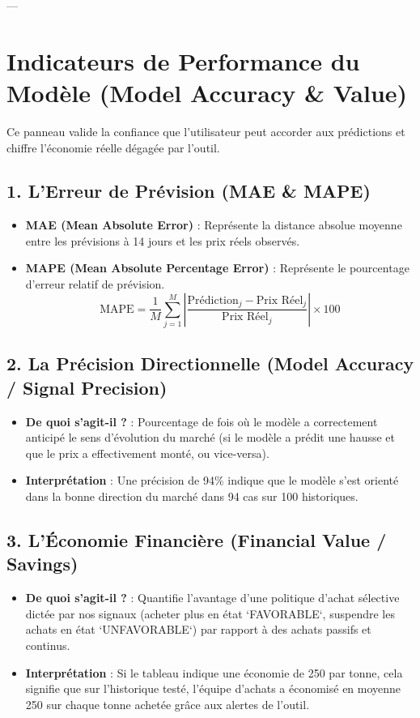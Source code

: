 \documentclass[12pt,a4paper]{article}
\begin{document}
---

\section{Indicateurs de Performance du Modèle (Model Accuracy \& Value)}
Ce panneau valide la confiance que l'utilisateur peut accorder aux prédictions et chiffre l'économie réelle dégagée par l'outil.

\subsection{1. L'Erreur de Prévision (MAE \& MAPE)}
\begin{itemize}
    \item \textbf{MAE (Mean Absolute Error)} : Représente la distance absolue moyenne entre les prévisions à 14 jours et les prix réels observés.
    \item \textbf{MAPE (Mean Absolute Percentage Error)} : Représente le pourcentage d'erreur relatif de prévision.
    \begin{equation}
    \text{MAPE} = \frac{1}{M} \sum_{j=1}^{M} \left| \frac{\text{Prédiction}_j - \text{Prix Réel}_j}{\text{Prix Réel}_j} \right| \times 100
    \end{equation}
\end{itemize}

\subsection{2. La Précision Directionnelle (Model Accuracy / Signal Precision)}
\begin{itemize}
    \item \textbf{De quoi s'agit-il ?} : Pourcentage de fois où le modèle a correctement anticipé le sens d'évolution du marché (si le modèle a prédit une hausse et que le prix a effectivement monté, ou vice-versa).
    \item \textbf{Interprétation} : Une précision de 94\% indique que le modèle s'est orienté dans la bonne direction du marché dans 94 cas sur 100 historiques.
\end{itemize}

\subsection{3. L'Économie Financière (Financial Value / Savings)}
\begin{itemize}
    \item \textbf{De quoi s'agit-il ?} : Quantifie l'avantage d'une politique d'achat sélective dictée par nos signaux (acheter plus en état `FAVORABLE`, suspendre les achats en état `UNFAVORABLE`) par rapport à des achats passifs et continus.
    \item \textbf{Interprétation} : Si le tableau indique une économie de 250 \yen{} par tonne, cela signifie que sur l'historique testé, l'équipe d'achats a économisé en moyenne 250 \yen{} sur chaque tonne achetée grâce aux alertes de l'outil.
\end{itemize}
\end{document}
